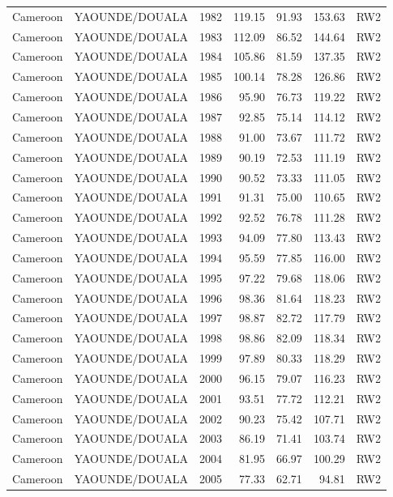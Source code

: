 \begin{longtable}{lllrrrl}
  Cameroon & YAOUNDE/DOUALA & 1982 & 119.15 & 91.93 & 153.63 & RW2 \\ 
  Cameroon & YAOUNDE/DOUALA & 1983 & 112.09 & 86.52 & 144.64 & RW2 \\ 
  Cameroon & YAOUNDE/DOUALA & 1984 & 105.86 & 81.59 & 137.35 & RW2 \\ 
  Cameroon & YAOUNDE/DOUALA & 1985 & 100.14 & 78.28 & 126.86 & RW2 \\ 
  Cameroon & YAOUNDE/DOUALA & 1986 & 95.90 & 76.73 & 119.22 & RW2 \\ 
  Cameroon & YAOUNDE/DOUALA & 1987 & 92.85 & 75.14 & 114.12 & RW2 \\ 
  Cameroon & YAOUNDE/DOUALA & 1988 & 91.00 & 73.67 & 111.72 & RW2 \\ 
  Cameroon & YAOUNDE/DOUALA & 1989 & 90.19 & 72.53 & 111.19 & RW2 \\ 
  Cameroon & YAOUNDE/DOUALA & 1990 & 90.52 & 73.33 & 111.05 & RW2 \\ 
  Cameroon & YAOUNDE/DOUALA & 1991 & 91.31 & 75.00 & 110.65 & RW2 \\ 
  Cameroon & YAOUNDE/DOUALA & 1992 & 92.52 & 76.78 & 111.28 & RW2 \\ 
  Cameroon & YAOUNDE/DOUALA & 1993 & 94.09 & 77.80 & 113.43 & RW2 \\ 
  Cameroon & YAOUNDE/DOUALA & 1994 & 95.59 & 77.85 & 116.00 & RW2 \\ 
  Cameroon & YAOUNDE/DOUALA & 1995 & 97.22 & 79.68 & 118.06 & RW2 \\ 
  Cameroon & YAOUNDE/DOUALA & 1996 & 98.36 & 81.64 & 118.23 & RW2 \\ 
  Cameroon & YAOUNDE/DOUALA & 1997 & 98.87 & 82.72 & 117.79 & RW2 \\ 
  Cameroon & YAOUNDE/DOUALA & 1998 & 98.86 & 82.09 & 118.34 & RW2 \\ 
  Cameroon & YAOUNDE/DOUALA & 1999 & 97.89 & 80.33 & 118.29 & RW2 \\ 
  Cameroon & YAOUNDE/DOUALA & 2000 & 96.15 & 79.07 & 116.23 & RW2 \\ 
  Cameroon & YAOUNDE/DOUALA & 2001 & 93.51 & 77.72 & 112.21 & RW2 \\ 
  Cameroon & YAOUNDE/DOUALA & 2002 & 90.23 & 75.42 & 107.71 & RW2 \\ 
  Cameroon & YAOUNDE/DOUALA & 2003 & 86.19 & 71.41 & 103.74 & RW2 \\ 
  Cameroon & YAOUNDE/DOUALA & 2004 & 81.95 & 66.97 & 100.29 & RW2 \\ 
  Cameroon & YAOUNDE/DOUALA & 2005 & 77.33 & 62.71 & 94.81 & RW2 \\ 

\end{longtable}
